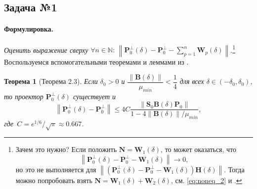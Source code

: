 \documentclass[specialist,
               substylefile = spbu_report.rtx,
               subf,href,colorlinks=true, 12pt]{disser}
\newcommand\norm[1]{\left\|#1\right\|}
\newtheorem{theorem}{Теорема}
\newenvironment{formulation}{\paragraph{Формулировка.}}{\hfill}
\begin{document}
\subsection{Задача №1}
\begin{formulation}
\emph{Оценить выражение сверху }$\forall n\in\mathbb{N}:\,\norm{\mathbf{P}_0^\bot(\delta) - \mathbf{P}_0^\bot - \sum\limits^n_{p=1}\mathbf{W}_p(\delta)}$.\footnote{Зачем это нужно? Если положить $\mathbf{N}=\mathbf{W}_1(\delta)$, то может оказаться, что 
\begin{equation*}
	\norm{\mathbf{P}_0^\bot(\delta) - \mathbf{P}_0^\bot - \mathbf{W}_1(\delta)}\to 0,
	\end{equation*}
но это не выполняется для $\norm{(\mathbf{P}_0^\bot(\delta) - \mathbf{P}_0^\bot - \mathbf{W}_1(\delta))\mathbf{H}(\delta)}$.
Тогда можно попробовать взять $\mathbf{N}=\mathbf{W}_1(\delta)+\mathbf{W}_2(\delta)$, см. \eqref{eq:noneq_2} и \cite{ZNekrutkin}.}
\end{formulation}
\\
Воспользуемся вспомогательными теоремами и леммами из \cite{Nekrutkin10}.
\begin{theorem}[Теорема 2.3]
\label{th:1}
	\rm \emph{Если} $\delta_0 > 0$ \emph{и} $\dfrac{\norm{\mathbf{B}(\delta)}}{\mu_{min}} < \dfrac{1}{4}$ \emph{для всех} $\delta \in (-\delta_0, \delta_0)$\emph{, то проектор} $\mathbf{P}^\bot_0(\delta)$ \emph{существует и} \begin{equation}\norm{\mathbf{P}_0^\bot(\delta) - \mathbf{P}_0^\bot} \leqslant 4C\dfrac{\norm{\mathbf{S}_0\mathbf{B}(\delta)\mathbf{P}_0}}{1 - 4\norm{\mathbf{B}(\delta)}/\mu_{min}}\label{eq:6},
	\end{equation}
	\emph{где} $\,C = e^{1/6}/\sqrt{\pi}\approx0.667$.
\end{theorem}
\end{document}
